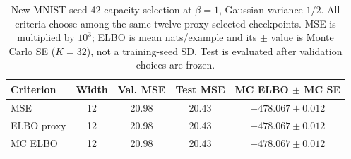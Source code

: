 \begin{table}[H]
\caption{New MNIST seed-42 capacity selection at $\beta=1$, Gaussian variance $1/2$. All criteria choose among the same twelve proxy-selected checkpoints. MSE is multiplied by $10^3$; ELBO is mean nats/example and its $\pm$ value is Monte Carlo SE ($K=32$), not a training-seed SD. Test is evaluated after validation choices are frozen.}\label{tab:mcselection}
\small
\setlength{\tabcolsep}{3pt}
\begin{tabular*}{\textwidth}{@{\extracolsep{\fill}}lcccc@{}}
\toprule
Criterion & Width & Val. MSE & Test MSE & MC ELBO $\pm$ MC SE \\
\midrule
MSE & 12 & 20.98 & 20.43 & $-478.067 \pm 0.012$ \\
ELBO proxy & 12 & 20.98 & 20.43 & $-478.067 \pm 0.012$ \\
MC ELBO & 12 & 20.98 & 20.43 & $-478.067 \pm 0.012$ \\
\bottomrule\end{tabular*}
\end{table}

